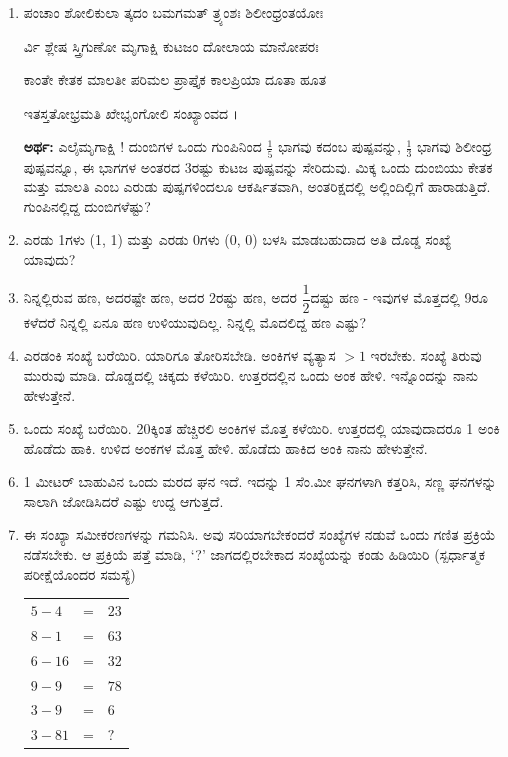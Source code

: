 \begin{enumerate}
\item ಪಂಚಾಂ ಶೋಲಿಕುಲಾ ತ್ಕದಂ ಬಮಗಮತ್ ತ್ರ್ಯಂಶಃ ಶಿಲೀಂಧ್ರಂತಯೋಃ 

ರ್ವಿ ಶ್ಲೇಷ ಸ್ತ್ರಿಗುಣೋ ಮೃಗಾಕ್ಷಿ ಕುಟಜಂ ದೋಲಾಯ ಮಾನೋಪರಃ 

ಕಾಂತೇ ಕೇತಕ ಮಾಲತೀ ಪರಿಮಲ ಪ್ರಾಪ್ತೈಕ ಕಾಲಪ್ರಿಯಾ ದೂತಾ ಹೂತ 

ಇತಸ್ತತೋಭ್ರಮತಿ ಖೇಭೃಂಗೋಲಿ ಸಂಖ್ಯಾಂವದ ।


\vskip 0.2cm

{\bf ಅರ್ಥ:} ಎಲೈಮೃಗಾಕ್ಷಿ ! ದುಂಬಿಗಳ ಒಂದು ಗುಂಪಿನಿಂದ $\frac{1}{5}$ ಭಾಗವು ಕದಂಬ ಪುಷ್ಪವನ್ನು, $\frac{1}{3}$ ಭಾಗವು ಶಿಲೀಂಧ್ರ ಪುಷ್ಪವನ್ನೂ, ಈ ಭಾಗಗಳ ಅಂತರದ 3ರಷ್ಟು ಕುಟಜ ಪುಷ್ಪವನ್ನು ಸೇರಿದುವು. ಮಿಕ್ಕ ಒಂದು ದುಂಬಿಯು ಕೇತಕ ಮತ್ತು ಮಾಲತಿ ಎಂಬ ಎರುಡು ಪುಷ್ಪಗಳಿಂದಲೂ ಆಕರ್ಷಿತವಾಗಿ, ಅಂತರಿಕ್ಷದಲ್ಲಿ ಅಲ್ಲಿಂದಿಲ್ಲಿಗೆ ಹಾರಾಡುತ್ತಿದೆ. ಗುಂಪಿನಲ್ಲಿದ್ದ ದುಂಬಿಗಳೆಷ್ಟು?  

\item ಎರಡು 1ಗಳು (1, 1) ಮತ್ತು ಎರಡು 0ಗಳು (0, 0) ಬಳಸಿ ಮಾಡಬಹುದಾದ ಅತಿ ದೊಡ್ಡ ಸಂಖ್ಯೆ ಯಾವುದು? 

\item ನಿನ್ನಲ್ಲಿರುವ ಹಣ, ಅದರಷ್ಟೇ ಹಣ, ಅದರ 2ರಷ್ಟು ಹಣ, ಅದರ $\dfrac{1}{2}$ದಷ್ಟು ಹಣ - ಇವುಗಳ ಮೊತ್ತದಲ್ಲಿ 9ರೂ ಕಳೆದರೆ ನಿನ್ನಲ್ಲಿ ಏನೂ ಹಣ ಉಳಿಯುವುದಿಲ್ಲ. ನಿನ್ನಲ್ಲಿ ಮೊದಲಿದ್ದ ಹಣ ಎಷ್ಟು? 

\item ಎರಡಂಕಿ ಸಂಖ್ಯೆ ಬರೆಯಿರಿ. ಯಾರಿಗೂ ತೋರಿಸಬೇಡಿ. ಅಂಕಿಗಳ ವ್ಯತ್ಯಾಸ $> 1$ ಇರಬೇಕು. ಸಂಖ್ಯೆ ತಿರುವು ಮುರುವು ಮಾಡಿ. ದೊಡ್ಡದಲ್ಲಿ ಚಿಕ್ಕದು ಕಳೆಯಿರಿ. ಉತ್ತರದಲ್ಲಿನ ಒಂದು ಅಂಕ ಹೇಳಿ. ಇನ್ನೊಂದನ್ನು ನಾನು ಹೇಳುತ್ತೇನೆ. 

\item ಒಂದು ಸಂಖ್ಯೆ ಬರೆಯಿರಿ. 20ಕ್ಕಿಂತ ಹೆಚ್ಚಿರಲಿ ಅಂಕಿಗಳ ಮೊತ್ತ ಕಳೆಯಿರಿ. ಉತ್ತರದಲ್ಲಿ ಯಾವುದಾದರೂ 1 ಅಂಕಿ ಹೊಡೆದು ಹಾಕಿ. ಉಳಿದ ಅಂಕಗಳ ಮೊತ್ತ ಹೇಳಿ. ಹೊಡೆದು ಹಾಕಿದ ಅಂಕಿ ನಾನು ಹೇಳುತ್ತೇನೆ. 

\item 1 ಮೀಟರ್ ಬಾಹುವಿನ ಒಂದು ಮರದ ಘನ ಇದೆ. ಇದನ್ನು 1 ಸೆಂ.ಮೀ ಘನಗಳಾಗಿ  ಕತ್ತರಿಸಿ, ಸಣ್ಣ ಘನಗಳನ್ನು ಸಾಲಾಗಿ ಜೋಡಿಸಿದರೆ ಎಷ್ಟು ಉದ್ದ ಆಗುತ್ತದೆ. 

\item ಈ ಸಂಖ್ಯಾ ಸಮೀಕರಣಗಳನ್ನು ಗಮನಿಸಿ. ಅವು ಸರಿಯಾಗಬೇಕಂದರೆ ಸಂಖ್ಯೆಗಳ ನಡುವೆ ಒಂದು ಗಣಿತ ಪ್ರಕ್ರಿಯೆ ನಡೆಸಬೇಕು. ಆ ಪ್ರಕ್ರಿಯೆ ಪತ್ತೆ ಮಾಡಿ, `?' ಜಾಗದಲ್ಲಿರಬೇಕಾದ ಸಂಖ್ಯೆಯನ್ನು ಕಂಡು ಹಿಡಿಯಿರಿ (ಸ್ಪರ್ಧಾತ್ಮಕ ಪರೀಕ್ಷೆ\break ಯೊಂದರ ಸಮಸ್ಯೆ)

\begin{tabular}[t]{l@{\;}c@{\;}l}
$5-4$ & = & $23$\\
$8-1$ & = & $63$\\
$6-16$ & = & $32$\\
$9-9$ & = & $78$\\
$3-9$ & = & $6$\\
$3-81$ & = & $?$
\end{tabular}


\end{enumerate}
